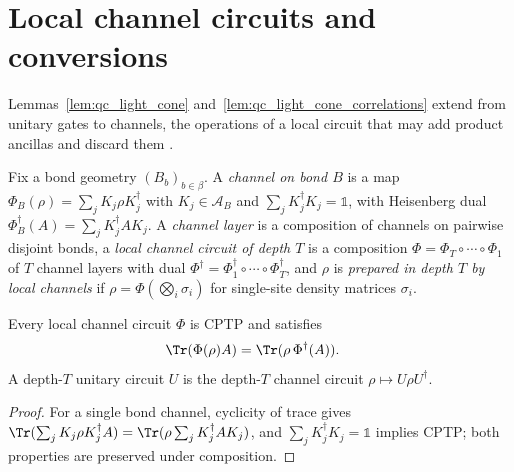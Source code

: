 
\section{Local channel circuits and conversions}
\label{sec:qc_channels}

Lemmas~\ref{lem:qc_light_cone} and~\ref{lem:qc_light_cone_correlations}
extend from unitary gates to channels, the operations
of a local circuit that may add product ancillas and discard them
\cite{Piroli2021LOCC}.

\begin{definition}
    \label{def:qc_local_channel_circuit}
    \leanok
    Fix a bond geometry $(B_b)_{b\in\beta}$. A \emph{channel on bond $B$} is a map $\Phi_B(\rho)=\sum_j K_j\rho K_j^\dagger$ with $K_j\in\mathcal A_B$ and $\sum_j K_j^\dagger K_j=\mathbb 1$, with Heisenberg dual $\Phi_B^\dagger(A)=\sum_j K_j^\dagger AK_j$. A \emph{channel layer} is a composition of channels on pairwise disjoint bonds, a \emph{local channel circuit of depth $T$} is a composition $\Phi=\Phi_T\circ\cdots\circ\Phi_1$ of $T$ channel layers with dual $\Phi^\dagger=\Phi_1^\dagger\circ\cdots\circ\Phi_T^\dagger$, and $\rho$ is \emph{prepared in depth $T$ by local channels} if $\rho=\Phi(\bigotimes_i\sigma_i)$ for single-site density matrices $\sigma_i$.
\end{definition}

\begin{lemma}
    \label{lem:qc_local_channel_circuit_properties}
    \leanok
    Every local channel circuit $\Phi$ is CPTP and satisfies
    \begin{align}
        \Tr(\Phi(\rho)A) & =\Tr(\rho\,\Phi^\dagger(A)).
        \label{eq:qc_channel_circuit_duality}
    \end{align}
    A depth-$T$ unitary circuit $U$ is the depth-$T$ channel circuit $\rho\mapsto U\rho U^\dagger$.
\end{lemma}
\begin{proof}
    \leanok
    For a single bond channel, cyclicity of trace gives $\Tr(\sum_j K_j\rho K_j^\dagger A)=\Tr(\rho\sum_j K_j^\dagger AK_j)$, and $\sum_j K_j^\dagger K_j=\mathbb 1$ implies CPTP; both properties are preserved under composition.
\end{proof}

